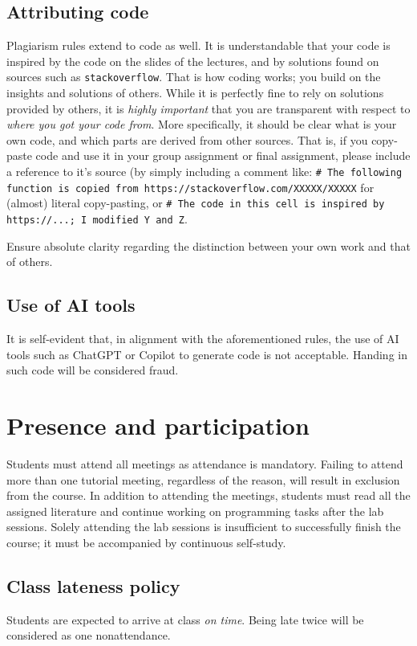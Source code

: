 \documentclass[a4paper,10pt]{report}
\begin{document}
\subsection{Attributing code}
Plagiarism rules extend to code as well. It is understandable that your code is inspired by the code on the slides of the lectures, and by solutions found on sources such as \texttt{stackoverflow}. That is how coding works; you build on the insights and solutions of others. While it is perfectly fine to rely on solutions provided by others, it is \emph{highly important} that you are transparent with respect to \emph{where you got your code from}. More specifically, it should be clear what is your own code, and which parts are derived from other sources. That is, if you copy-paste code and use it in your group assignment or final assignment, please include a reference to it's source (by simply including a comment like: \texttt{\# The following function is copied from https://stackoverflow.com/XXXXX/XXXXX} for (almost) literal copy-pasting, or \texttt{\# The code in this cell is inspired by https://...; I modified Y and Z}. 

Ensure absolute clarity regarding the distinction between your own work and that of others. 

\subsection{Use of AI tools}
It is self-evident that, in alignment with the aforementioned rules, the use of AI tools such as ChatGPT or Copilot to generate code is not acceptable. Handing in such code will be considered fraud.

\section{Presence and participation}
Students must attend all meetings as attendance is mandatory. Failing to attend more than one tutorial meeting, regardless of the reason, will result in exclusion from the course. In addition to attending the meetings, students must read all the assigned literature and continue working on programming tasks after the lab sessions. Solely attending the lab sessions is insufficient to successfully finish the course; it must be accompanied by continuous self-study.

\subsection{Class lateness policy} Students are expected to arrive at class \emph{on time}. Being late twice will be considered as one nonattendance. \\
\end{document}
